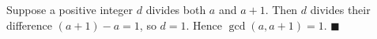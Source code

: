 Suppose a positive integer $d$ divides both $a$ and $a+1$. Then $d$ divides their difference $(a+1)-a=1$, so $d=1$. Hence $\gcd(a,a+1)=1$. $\blacksquare$
